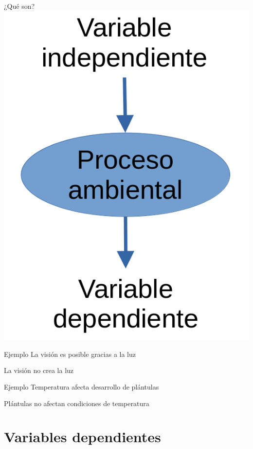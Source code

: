 \documentclass[
  11pt,
  ignorenonframetext,
]{beamer}
\begin{document}
\begin{frame}{¿Qué son?}
\protect\hypertarget{quuxe9-son-1}{}
\includegraphics{Figuras-variables/Tipos-variables.png}
\end{frame}

\begin{frame}{Ejemplo}
\protect\hypertarget{ejemplo}{}
La visión es posible gracias a la luz

La visión no crea la luz
\end{frame}

\begin{frame}{Ejemplo}
\protect\hypertarget{ejemplo-1}{}
Temperatura afecta desarrollo de plántulas

Plántulas no afectan condiciones de temperatura
\end{frame}

\hypertarget{variables-dependientes}{%
\section{Variables dependientes}\label{variables-dependientes}}
\end{document}
